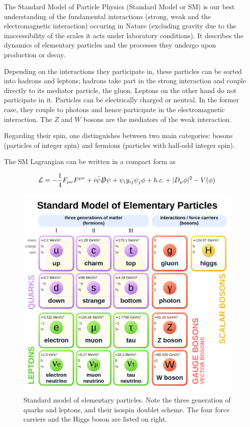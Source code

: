 \label{ch:theory}


The Standard Model of Particle Physics (Standard Model or SM) is our best understanding of the fundamental interactions (strong, weak and the electromagnetic interaction) occuring in Nature (excluding gravity due to the inaccessibility of the scales it acts under laboratory conditions). It describes the dynamics of elementary particles and the processes they undergo upon production or decay.

Depending on the interactions they participate in, these particles can be sorted into hadrons and leptons; hadrons take part in the strong interaction and couple directly to its mediator particle, the gluon. Leptons on the other hand do not participate in it. Particles can be electrically charged or neutral. In the former case, they couple to photons and hence participate in the electromagnetic interaction. The $Z$ and $W$ bosons are the mediators of the weak interaction.

Regarding their spin, one distinguishes between two main categories: bosons (particles of integer spin) and fermions (particles with half-odd integer spin).

The SM Lagrangian can be written in a compact form as

\begin{equation}
	\mathcal{L} = -\frac{1}{4}F_{\mu\nu}F^{\mu\nu} + i \bar{\psi}\slashed{D}\psi + \psi_iy_{ij}\psi_j\phi + h.c. + |D_\mu\phi|^2 - V(\phi)
	\label{eq:lagrangian}
\end{equation}

\begin{figure}[h!]
	\centering
	\includegraphics[width=0.6\linewidth]{figures/theory/sm.png}
	\caption{Standard model of elementary particles. Note the three generation of quarks and leptons, and their isospin doublet scheme. The four force carriers and the Higgs boson are listed on right. \cite{enwiki:1101993746}}
	\label{fig:sm}
\end{figure}

